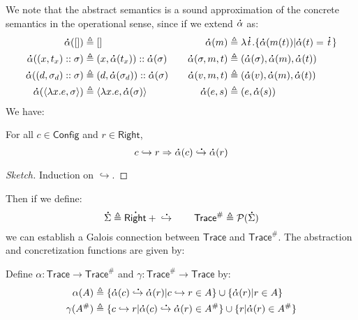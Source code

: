 \documentclass[acmsmall,screen,review]{acmart}\settopmatter{printfolios=true,printccs=false,printacmref=false}
\theoremstyle{acmdefinition}
\newcommand*{\cons}{::}
\newcommand*{\pset}{\mathcal{P}}
\newcommand*{\A}[1]{\overset{\,_{\mbox{\Large .}}}{#1}}
\newcommand*{\Abs}[1]{{#1}^{\#}}
\newcommand*{\modid}{d}
\newcommand*{\ctx}{\sigma}
\newcommand*{\mem}{m}
\newcommand*{\Trace}{\mathsf{Trace}}
\newcommand*{\Config}{\mathsf{Config}}
\newcommand*{\config}{c}
\newcommand*{\Right}{\mathsf{Right}}
\newcommand*{\rightst}{r}
\newcommand*{\semarrow}{\hookrightarrow}
\newcommand*{\asemarrow}{\A{\hookrightarrow}}
\begin{document}
We note that the abstract semantics is a sound approximation of the concrete semantics in the operational sense, since if we extend $\A\alpha$ as:
\begin{align*}
  \A\alpha([])                             & \triangleq []                                               &  &  & \A\alpha(\mem)        & \triangleq\lambda\A{t}.\{\A\alpha(\mem(t))|\A\alpha(t)=\A{t}\} \\
  \A\alpha((x,t_x)\cons \ctx)              & \triangleq(x,\A\alpha(t_x))\cons\A\alpha(\ctx)              &  &  & \A\alpha(\ctx,\mem,t) & \triangleq(\A\alpha(\ctx),\A\alpha(\mem),\A\alpha(t))          \\
  \A\alpha((\modid,\ctx_\modid)\cons \ctx) & \triangleq(\modid,\A\alpha(\ctx_\modid))\cons\A\alpha(\ctx) &  &  & \A\alpha(v,\mem,t)    & \triangleq(\A\alpha(v),\A\alpha(\mem),\A\alpha(t))             \\
  \A\alpha(\langle\lambda x.e,\ctx\rangle) & \triangleq\langle\lambda x.e,\A\alpha(\ctx)\rangle          &  &  & \A\alpha(e,s)         & \triangleq (e,\A\alpha(s))
\end{align*}
We have:
\begin{lemma}\label{lem:opsound}
  For all $\config\in\Config$ and $\rightst\in\Right$,
  \[\config\semarrow\rightst\Rightarrow\A\alpha(\config)\A\semarrow\A\alpha(\rightst)\]
\end{lemma}
\begin{proof}[Sketch]
  Induction on $\semarrow$.
\end{proof}

Then if we define:
\[\A\Sigma\triangleq\A\Right\:+\:\A\semarrow\qquad\Abs{\Trace}\triangleq\pset(\A\Sigma)\]
we can establish a Galois connection between $\Trace$ and $\Abs{\Trace}$.
The abstraction and concretization functions are given by:
\begin{definition}
  Define $\alpha:\Trace\rightarrow\Abs{\Trace}$ and $\gamma:\Abs{\Trace}\rightarrow \Trace$ by:
  \begin{align*}
    \alpha(A)       & \triangleq\{\A\alpha(\config)\asemarrow\A\alpha(\rightst)|\config\semarrow\rightst\in A\}\cup\{\A\alpha(\rightst)|\rightst\in A\}           \\
    \gamma(\Abs{A}) & \triangleq\{\config\semarrow\rightst|\A\alpha(\config)\asemarrow\A\alpha(\rightst)\in\Abs{A}\}\cup\{\rightst|\A\alpha(\rightst)\in\Abs{A}\}
  \end{align*}
\end{definition}
\end{document}
